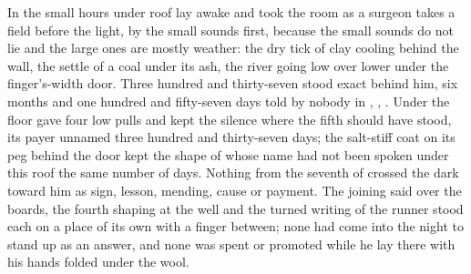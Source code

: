 
In the small hours under  roof  lay awake and took the room as a surgeon takes a field before the light, by the small sounds first, because the small sounds do not lie and the large ones are mostly weather: the dry tick of clay cooling behind the wall, the settle of a coal under its ash, the river going low over lower under the finger's-width door. Three hundred and thirty-seven stood exact behind him, six months and one hundred and fifty-seven days told by nobody in , , . Under the floor  gave four low pulls and kept the silence where the fifth should have stood, its payer unnamed three hundred and thirty-seven days; the salt-stiff coat on its peg behind the door kept the shape of  whose name had not been spoken under this roof the same number of days. Nothing from the seventh of  crossed the dark toward him as sign, lesson, mending, cause or payment. The joining said over the boards, the fourth shaping at the well and the turned writing of the runner stood each on a place of its own with a finger between; none had come into the night to stand up as an answer, and none was spent or promoted while he lay there with his hands folded under the wool.

